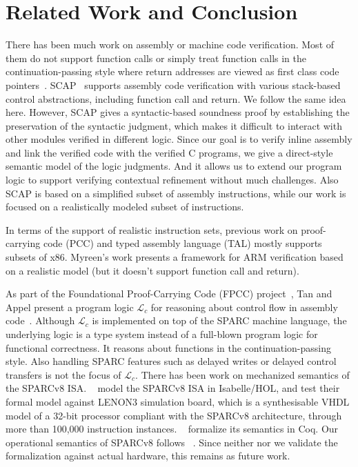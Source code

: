 \section{Related Work and Conclusion}
\label{sec:conclusion}

There has been much work on assembly or
machine code verification. Most of them
do not support function calls or simply
treat function calls in the continuation-passing
style where return addresses are viewed as first
class code pointers~\cite{PCC,FPCC,TAL,TALx86,Yu03ESOP,xcap,cflogic}.
SCAP~\cite{Feng06pldi} supports assembly code verification
with various stack-based control abstractions, including
function call and return. We follow the same idea here.
However, SCAP gives a syntactic-based soundness proof
by establishing the preservation of the syntactic judgment,
which makes it difficult to interact with other modules
verified in different logic. Since our goal is to
verify inline assembly and link the verified code
with the verified C programs, we give a direct-style
semantic model of the logic judgments. And it allows us 
to extend our program logic to support verifying 
contextual refinement without much challenges. 
Also SCAP
is based on a simplified subset of assembly instructions,
while our work is focused on a realistically modeled
subset of \sparc{} instructions.

In terms of the support of realistic instruction sets,
previous work on proof-carrying code (PCC) and
typed assembly language (TAL) mostly supports subsets of
x86.
Myreen's work \cite{arm-veri} presents a framework for
ARM verification based on a realistic model
(but it doesn't support function call and return).

As part of the Foundational Proof-Carrying Code (FPCC)
project~\cite{FPCC},
Tan and Appel present a program logic $\mathcal{L}_c$
for reasoning about control flow in assembly code~\cite{cflogic}.
Although $\mathcal{L}_c$ is implemented 
on top of the SPARC machine language, 
the underlying logic is a type system instead
of a full-blown program logic for functional correctness.
It reasons about functions in the continuation-passing
style. Also 
handling SPARC features such as delayed writes or delayed
control transfers is not the focus of $\mathcal{L}_c$.
There has been work on mechanized semantics of the SPARCv8 ISA.
~\cite{sparcv8-formalization-Isabelle} model the SPARCv8 ISA
in Isabelle/HOL, and test their formal model against 
LENON3 simulation board, 
which is a synthesisable VHDL model of a 32-bit processor 
compliant with the SPARCv8 architecture, 
through more than 100,000 instruction instances.   
~\cite{sparc-formalization} formalize its semantics in Coq.
Our operational semantics of SPARCv8 follows ~\cite{sparc-formalization}.
Since neither  nor we validate the 
formalization against actual hardware, this remains 
as future work. 


